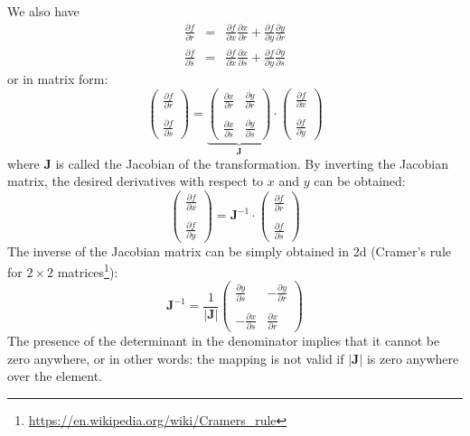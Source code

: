 We also have 
\begin{eqnarray}
\frac{\partial f}{\partial r} &=&
\frac{\partial f}{\partial x}\frac{\partial x}{\partial r}
+\frac{\partial f}{\partial y}\frac{\partial y}{\partial r} \\
\frac{\partial f}{\partial s} &=&
\frac{\partial f}{\partial x}\frac{\partial x}{\partial s}
+\frac{\partial f}{\partial y}\frac{\partial y}{\partial s}
\end{eqnarray}
or in matrix form:
\begin{equation}
\left(
\begin{array}{c}
\frac{\partial f}{\partial r} \\ \\
\frac{\partial f}{\partial s}
\end{array}
\right)
=
\underbrace{
\left(
\begin{array}{cc}
\frac{\partial x}{\partial r} & \frac{\partial y}{\partial r} \nonumber\\ \\
\frac{\partial x}{\partial s} & \frac{\partial y}{\partial s} \nonumber
\end{array}
\right)
}_{\bm J}
\cdot
\left(
\begin{array}{c}
\frac{\partial f}{\partial x} \\ \\
\frac{\partial f}{\partial y}
\end{array}
\right)
\end{equation}
where ${\bm J}$ is called the Jacobian of the transformation.
By inverting the Jacobian matrix, the desired derivatives with respect to $x$
and $y$ can be obtained:
\[
\left(
\begin{array}{c}
\frac{\partial f}{\partial x} \\ \\
\frac{\partial f}{\partial y}
\end{array}
\right)
=
{\bm J}^{-1} \cdot 
\left(
\begin{array}{c}
\frac{\partial f}{\partial r} \\ \\
\frac{\partial f}{\partial s}
\end{array}
\right)
\]
The inverse of the Jacobian matrix can be simply obtained in 
2d (Cramer's rule for $2\times2$ matrices\footnote{\url{https://en.wikipedia.org/wiki/Cramers_rule}}):
\[
{\bm J}^{-1} = \frac{1}{|{\bm J}|} 
\left(
\begin{array}{cc}
\frac{\partial y}{\partial s} & -\frac{\partial y}{\partial r} \nonumber\\ \\
-\frac{\partial x}{\partial s} & \frac{\partial x}{\partial r} \nonumber
\end{array}
\right)
\]
The presence of the determinant in the denominator implies that it cannot 
be zero anywhere, or in other words: the mapping is not valid if $|{\bm J}|$
is zero anywhere over the element.


